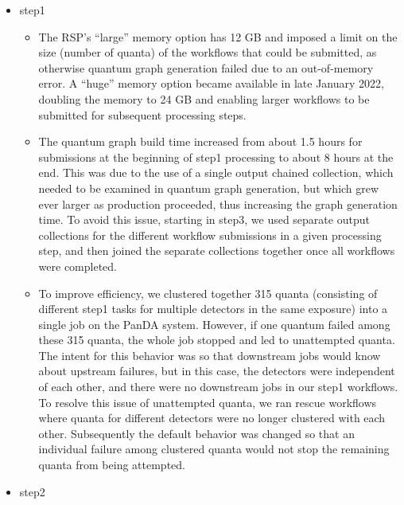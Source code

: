 \begin{itemize}

\item step1
\begin{itemize}

  \item
  The RSP’s ``large'' memory option has 12 GB and imposed a limit on the size (number of quanta) of the workflows that could be submitted, as otherwise quantum graph generation failed due to an out-of-memory error.
  A ``huge'' memory option became available in late January 2022, doubling the memory to 24 GB and enabling larger workflows to be submitted for subsequent processing steps.

  \item
  The quantum graph build time increased from about 1.5 hours for submissions at the beginning of step1 processing to about 8 hours at the end.
  This was due to the use of a single output chained collection, which needed to be examined in quantum graph generation, but which grew ever larger as production proceeded, thus increasing the graph generation time.
  To avoid this issue, starting in step3, we used separate output collections for the different workflow submissions in a given processing step, and then joined the separate collections together once all workflows were completed.

  \item
  To improve efficiency, we clustered together 315 quanta (consisting of different step1 tasks for multiple detectors in the same exposure) into a single job on the PanDA system.
  However, if one quantum failed among these 315 quanta, the whole job stopped and led to unattempted quanta.
  The intent for this behavior was so that downstream jobs would know about upstream failures, but in this case, the detectors were independent of each other, and there were no downstream jobs in our step1 workflows.
  To resolve this issue of unattempted quanta, we ran rescue workflows where quanta for different detectors were no longer clustered with each other.
  Subsequently the default behavior was changed so that an individual failure among clustered quanta would not stop the remaining quanta from being attempted.

\end{itemize} %

\item step2
\begin{itemize}


\end{itemize}
\end{itemize}
